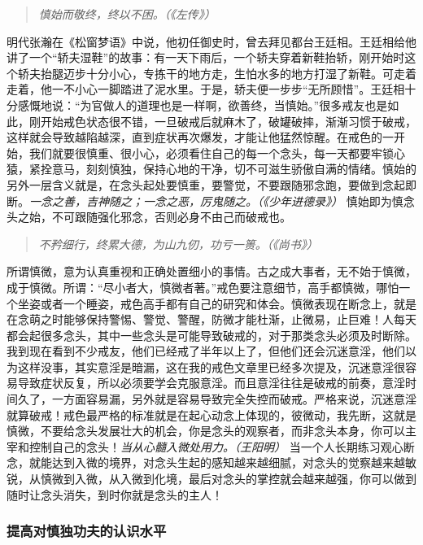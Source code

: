 \begin{quote}\it
    慎始而敬终，终以不困。（《左传》）
\end{quote}

明代张瀚在《松窗梦语》中说，他初任御史时，曾去拜见都台王廷相。王廷相给他讲了一个“轿夫湿鞋”的故事：有一天下雨后，一个轿夫穿着新鞋抬轿，刚开始时这个轿夫抬腿迈步十分小心，专拣干的地方走，生怕水多的地方打湿了新鞋。可走着走着，他一不小心一脚踏进了泥水里。于是，轿夫便一步步“无所顾惜”。王廷相十分感慨地说：“为官做人的道理也是一样啊，欲善终，当慎始。”很多戒友也是如此，刚开始戒色状态很不错，一旦破戒后就麻木了，破罐破摔，渐渐习惯于破戒，这样就会导致越陷越深，直到症状再次爆发，才能让他猛然惊醒。在戒色的一开始，我们就要很慎重、很小心，必须看住自己的每一个念头，每一天都要牢锁心猿，紧拴意马，刻刻慎独，保持心地的干净，切不可滋生骄傲自满的情绪。慎始的另外一层含义就是，在念头起处要慎重，要警觉，不要跟随邪念跑，要做到念起即断。\textit{一念之善，吉神随之；一念之恶，厉鬼随之。（《少年进德录》）} 慎始即为慎念头之始，不可跟随强化邪念，否则必身不由己而破戒也。

\begin{quote}\it
    不矜细行，终累大德，为山九仞，功亏一篑。（《尚书》）
\end{quote}

所谓慎微，意为认真重视和正确处置细小的事情。古之成大事者，无不始于慎微，成于慎微。所谓：“尽小者大，慎微者著。”戒色要注意细节，高手都慎微，哪怕一个坐姿或者一个睡姿，戒色高手都有自己的研究和体会。慎微表现在断念上，就是在念萌之时能够保持警惕、警觉、警醒，防微才能杜渐，止微易，止巨难！人每天都会起很多念头，其中一些念头是可能导致破戒的，对于那类念头必须及时断除。我到现在看到不少戒友，他们已经戒了半年以上了，但他们还会沉迷意淫，他们以为这样没事，其实意淫是暗漏，这在我的戒色文章里已经多次提及，沉迷意淫很容易导致症状反复，所以必须要学会克服意淫。而且意淫往往是破戒的前奏，意淫时间久了，一方面容易漏，另外就是容易导致完全失控而破戒。严格来说，沉迷意淫就算破戒！戒色最严格的标准就是在起心动念上体现的，彼微动，我先断，这就是慎微，不要给念头发展壮大的机会，你是念头的观察者，而非念头本身，你可以主宰和控制自己的念头！\textit{当从心髓入微处用力。（王阳明）} 当一个人长期练习观心断念，就能达到入微的境界，对念头生起的感知越来越细腻，对念头的觉察越来越敏锐，从慎微到入微，从入微到化境，最后对念头的掌控就会越来越强，你可以做到随时让念头消失，到时你就是念头的主人！

\subsubsection{提高对慎独功夫的认识水平}

